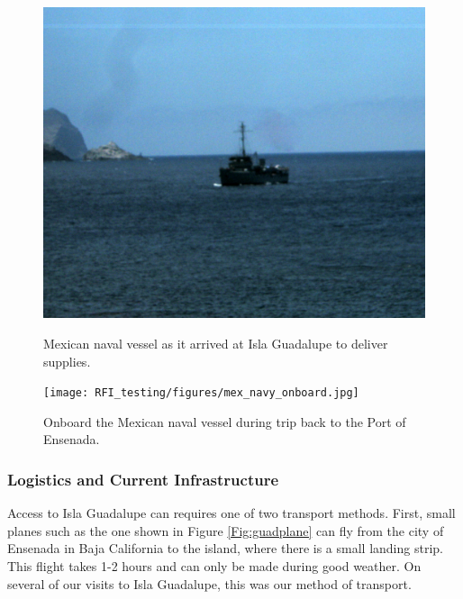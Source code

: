 \begin{figure}[htb]
\centering
\begin{minipage}[b]{0.47\textwidth}
\centering
\includegraphics[width=0.95\linewidth]{RFI_testing/figures/mex_navy_arrival.jpg}
\caption{Mexican naval vessel as it arrived at Isla Guadalupe to deliver supplies.}
\label{Fig:guadboat}
\end{minipage}%
\begin{minipage}[b]{0.02\textwidth}
\hspace{1cm}
\end{minipage}%
\begin{minipage}[b]{0.47\textwidth}
\centering
\texttt{[image: RFI\_testing/figures/mex\_navy\_onboard.jpg]}
\caption{Onboard the Mexican naval vessel during trip back to the Port of Ensenada.}
\label{Fig:guadonboard}
\end{minipage}
\end{figure}

\subsubsection{Logistics and Current Infrastructure}

Access to Isla Guadalupe can requires one of two transport methods. First, small planes such as the one shown in Figure \ref{Fig:guadplane} can fly from the city of Ensenada in Baja California to the island, where there is a small landing strip. This flight takes 1-2 hours and can only be made during good weather. On several of our visits to Isla Guadalupe, this was our method of transport. 

